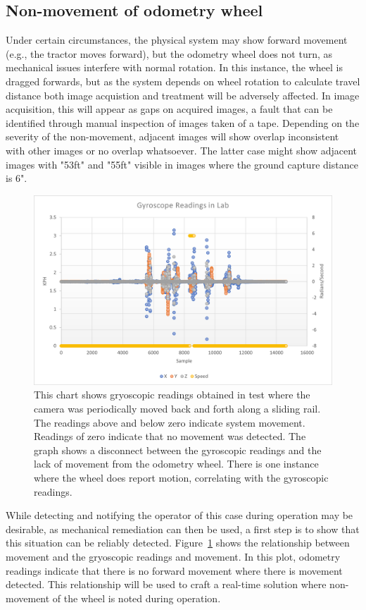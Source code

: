 \documentclass[12pt]{article}
\begin{document}
\subsection{Non-movement of odometry wheel}
\label{section:non-movement}
Under certain circumstances, the physical system may show forward movement (e.g., the tractor moves forward), but the odometry wheel does not turn, as mechanical issues interfere with normal rotation. In this instance, the wheel is dragged forwards, but as the system depends on wheel rotation to calculate travel distance both image acquistion and treatment will be adversely affected. In image acquisition, this will appear as gaps on acquired images, a fault that can be identified through manual inspection of images taken of a tape. Depending on the severity of the non-movement, adjacent images will show overlap inconsistent with other images or no overlap whatsoever. The latter case might show adjacent images with "53ft" and "55ft" visible in images where the ground capture distance is 6".
\begin{figure}[H]
	\centering
	\includegraphics[width=0.75\linewidth]{./figures/imu-readings-in-lab.png}
	\caption[Detection of system movement]{This chart shows gryoscopic readings obtained in test where the camera was periodically moved back and forth along a sliding rail. The readings above and below zero indicate system movement. Readings of zero indicate that no movement was detected. The graph shows a disconnect between the gyroscopic readings and the lack of movement from the odometry wheel. There is one instance where the wheel does report motion, correlating with the gyroscopic readings.}
	\label{fig:gyro-readings}
\end{figure}
While detecting and notifying the operator of this case during operation may be desirable, as mechanical remediation can then be used, a first step is to show that this situation can be reliably detected. Figure~\ref{fig:gyro-readings} shows the relationship between movement and the gryoscopic readings and movement. In this plot, odometry readings indicate that there is no forward movement where there is movement detected. This relationship will be used to craft a real-time solution where non-movement of the wheel is noted during operation.
\end{document}
